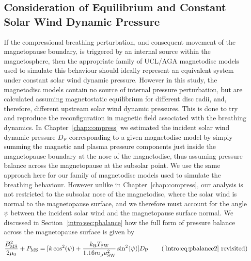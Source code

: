 \subsection{Consideration of Equilibrium and Constant Solar Wind Dynamic Pressure}\label{equinox:sec:constDp}
If the compressional breathing perturbation, and consequent movement of the magnetopause boundary, is triggered by an internal source within the magnetosphere, then the appropriate family of UCL/AGA magnetodisc models used to simulate this behaviour should ideally represent an equivalent system under constant solar wind dynamic pressure. However in this study, the magnetodisc models contain no source of internal pressure perturbation, but are calculated assuming magnetostatic equilibrium for different disc radii, and, therefore, different upstream solar wind dynamic pressures. This is done to try and reproduce the reconfiguration in magnetic field associated with the breathing dynamics. In Chapter~\ref{chap:compress} we estimated the incident solar wind dynamic pressure $D_\mathrm{P}$ corresponding to a given magnetodisc model by simply summing the magnetic and plasma pressure components just inside the magnetopause boundary at the nose of the magnetodisc, thus assuming pressure balance across the magnetopause at the subsolar point. We use the same approach here for our family of magnetodisc models used to simulate the breathing behaviour. However unlike in Chapter~\ref{chap:compress}, our analysis is not restricted to the subsolar nose of the magnetodisc, where the solar wind is normal to the magnetopause surface, and we therefore must account for the angle $\psi$ between the incident solar wind and the magnetopause surface normal. We discussed in Section~\ref{intro:sec:pbalance} how the full form of pressure balance across the magnetopause surface is given by 
\begin{equation*}\label{equinox:eq:pbalance}
\frac{B_\mathrm{MS}^2}{2\mu_0} + P_\mathrm{MS} = [k\cos^2(\psi) + \frac{k_\mathrm{B}T_\mathrm{SW}}{1.16m_\mathrm{p}u_\mathrm{SW}^2}\sin^2(\psi)] D_\mathrm{P} \tag{\ref{intro:eq:pbalance2} revisited}
\end{equation*}
